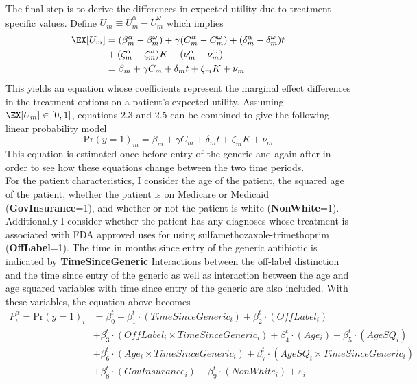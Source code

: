 The final step is to derive the differences in expected utility due to treatment-specific values. Define $\bar{U}_m \equiv \bar{U}^\alpha_m - \bar{U}^\omega_m$ which implies
\begin{equation}
\begin{split}
  \EX[U_m] & = (\beta_m^\alpha - \beta_m^\omega) + \gamma (C_m^\alpha - C_m^\omega) + (\delta_m^\alpha - \delta_m^\omega)t\\
  & + (\zeta^\alpha_m - \zeta^\omega_m)K + (\nu_m^\alpha - \nu_m^\omega)\\
  & = \beta_m + \gamma C_m + \delta_mt + \zeta_mK + \nu_m
\end{split}
\end{equation}
\indent This yields an equation whose coefficients represent the marginal effect differences in the treatment options on a patient's expected utility. Assuming $\EX[U_m] \in [0,1]$, equations 2.3 and 2.5 can be combined to give the following linear probability model
\begin{equation}
  \text{Pr}(y = 1)_m = \beta_m + \gamma C_m + \delta_mt + \zeta_mK + \nu_m
\end{equation}
This equation is estimated once before entry of the generic and again after in order to see how these equations change between the two time periods.\\
\indent For the patient characteristics, I consider the age of the patient, the squared age of the patient, whether the patient is on Medicare or Medicaid (\textbf{GovInsurance}=1), and whether or not the patient is white (\textbf{NonWhite}=1). Additionally I consider whether the patient has any diagnoses whose treatment is associated with FDA approved uses for using sulfamethozaxole-trimethoprim (\textbf{OffLabel}=1). The time in months since entry of the generic antibiotic is indicated by \textbf{TimeSinceGeneric} Interactions between the off-label distinction and the time since entry of the generic as well as interaction between the age and age squared variables with time since entry of the generic are also included. With these variables, the equation above becomes
\begin{equation}
\begin{split}
    P_i^\alpha =\text{Pr}(y = 1)_i & = \beta^t_0 + \beta^t_1\cdot(TimeSinceGeneric_i) + \beta_2^t\cdot(OffLabel_i)\\
    & + \beta_3^t\cdot(OffLabel_i\times TimeSinceGeneric_i) + \beta_4^t\cdot(Age_i) + \beta_5^t\cdot(AgeSQ_i)\\
    & + \beta_6^t\cdot(Age_i\times TimeSinceGeneric_i) + \beta_7^t\cdot(AgeSQ_i\times TimeSinceGeneric_i)\\
    & + \beta_8^t\cdot(GovInsurance_i) + \beta_9^t\cdot(NonWhite_i) + \varepsilon_i
\end{split}
\end{equation}
